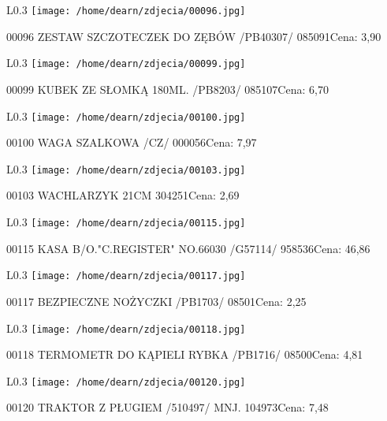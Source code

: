 \begin{wrapfigure}{L}{0.3\textwidth}
\texttt{[image: /home/dearn/zdjecia/00096.jpg]}
\end{wrapfigure}
00096 ZESTAW SZCZOTECZEK DO ZĘBÓW /PB40307/           085091Cena: 3,90\newline
\begin{wrapfigure}{L}{0.3\textwidth}
\texttt{[image: /home/dearn/zdjecia/00099.jpg]}
\end{wrapfigure}
00099 KUBEK ZE SŁOMKĄ 180ML. /PB8203/                 085107Cena: 6,70\newline
\begin{wrapfigure}{L}{0.3\textwidth}
\texttt{[image: /home/dearn/zdjecia/00100.jpg]}
\end{wrapfigure}
00100 WAGA SZALKOWA /CZ/                              000056Cena: 7,97\newline
\begin{wrapfigure}{L}{0.3\textwidth}
\texttt{[image: /home/dearn/zdjecia/00103.jpg]}
\end{wrapfigure}
00103 WACHLARZYK 21CM 304251Cena: 2,69\newline
\begin{wrapfigure}{L}{0.3\textwidth}
\texttt{[image: /home/dearn/zdjecia/00115.jpg]}
\end{wrapfigure}
00115 KASA B/O."C.REGISTER" NO.66030  /G57114/        958536Cena: 46,86\newline
\begin{wrapfigure}{L}{0.3\textwidth}
\texttt{[image: /home/dearn/zdjecia/00117.jpg]}
\end{wrapfigure}
00117 BEZPIECZNE NOŻYCZKI  /PB1703/                    08501Cena: 2,25\newline
\begin{wrapfigure}{L}{0.3\textwidth}
\texttt{[image: /home/dearn/zdjecia/00118.jpg]}
\end{wrapfigure}
00118 TERMOMETR DO KĄPIELI RYBKA /PB1716/              08500Cena: 4,81\newline
\begin{wrapfigure}{L}{0.3\textwidth}
\texttt{[image: /home/dearn/zdjecia/00120.jpg]}
\end{wrapfigure}
00120 TRAKTOR Z PŁUGIEM /510497/  MNJ.                104973Cena: 7,48\newline
